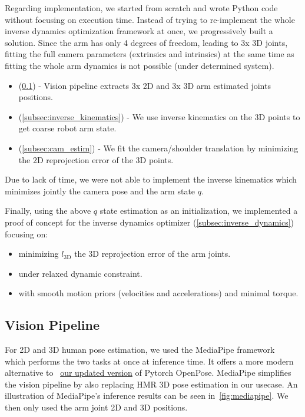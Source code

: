 Regarding implementation, we started from scratch and wrote Python code without focusing on execution time.
Instead of trying to re-implement the whole inverse dynamics optimization framework at once, we progressively built a solution.
Since the arm has only 4 degrees of freedom, leading to 3x 3D joints, 
fitting the full camera parameters (extrinsics and intrinsics) at the same time
as fitting the whole arm dynamics is not possible (under determined system).
\begin{itemize}
    \item (\ref{subsec:vision_pipeline}) - Vision pipeline 
    extracts 3x 2D and 3x 3D arm estimated joints positions.
    \item (\ref{subsec:inverse_kinematics}) - We use inverse kinematics  
    on the 3D points to get coarse robot arm state.
    \item (\ref{subsec:cam_estim}) - We fit the camera/shoulder translation 
    by minimizing the 2D reprojection error of the 3D points.
\end{itemize}



Due to lack of time, we were not able to implement the inverse kinematics which minimizes jointly
the camera pose and the arm state $q$.

Finally, using the above $q$ state estimation as an initialization,
we implemented a proof of concept for the inverse dynamics optimizer (\ref{subsec:inverse_dynamics}) focusing on:
\begin{itemize}
    \item minimizing $l_{\text{3D}}$ the 3D reprojection error of the arm joints.
    \item under relaxed dynamic constraint.
    \item with smooth motion priors (velocities and accelerations) and minimal torque.
\end{itemize}


\subsection{Vision Pipeline}
\label{subsec:vision_pipeline}

For 2D and 3D human pose estimation, we used the MediaPipe framework~\cite{lugaresi2019mediapipe} which performs the two tasks at once at inference time.
It offers a more modern alternative to ~\href{https://github.com/MattX20/pytorch-openpose}{our updated version} of Pytorch OpenPose. MediaPipe simplifies the vision pipeline by also replacing HMR 3D pose estimation in our usecase. An illustration of MediaPipe's inference results 
can be seen in~\cref{fig:mediapipe}. We then only used the arm joint 2D and 3D positions. 

